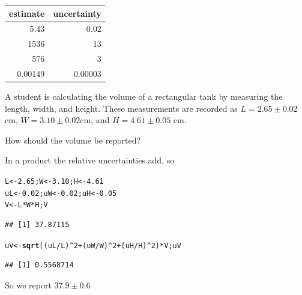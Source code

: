 \documentclass[twoside]{book}\usepackage[]{graphicx}\usepackage[]{xcolor}
\makeatletter
\newcommand{\hlnum}[1]{\textcolor[rgb]{0.686,0.059,0.569}{#1}}%
\newcommand{\hlopt}[1]{\textcolor[rgb]{0,0,0}{#1}}%
\newcommand{\hlstd}[1]{\textcolor[rgb]{0.345,0.345,0.345}{#1}}%
\newcommand{\hlkwb}[1]{\textcolor[rgb]{0.69,0.353,0.396}{#1}}%
\newcommand{\hlkwd}[1]{\textcolor[rgb]{0.737,0.353,0.396}{\textbf{#1}}}%
\newenvironment{kframe}{%
 \def\at@end@of@kframe{}%
 \ifinner\ifhmode%
  \def\at@end@of@kframe{\end{minipage}}%
  \begin{minipage}{\columnwidth}%
 \fi\fi%
 \def\FrameCommand##1{\hskip\@totalleftmargin \hskip-\fboxsep
 \colorbox{shadecolor}{##1}\hskip-\fboxsep
     \hskip-\linewidth \hskip-\@totalleftmargin \hskip\columnwidth}%
 \MakeFramed {\advance\hsize-\width
   \@totalleftmargin\z@ \linewidth\hsize
   \@setminipage}}%
 {\par\unskip\endMakeFramed%
 \at@end@of@kframe}
\newenvironment{knitrout}{}{} %
\makeatother
\begin{document}
\begin{solution}
	\begin{center}
	\begin{tabular}{rr}
		\hline
		estimate & uncertainty
		\\
		\hline
		5.43 & 0.02
		\\
		1536 & 13
		\\
		576 & 3
		\\
		0.00149 & 0.00003
		\\
		\hline
	\end{tabular}
	\end{center}
\end{solution}

\begin{problem}
	A student is calculating the volume of a rectangular tank by measuring 
	the length, width, and height.  These measurements are recorded as 
	 $L = 2.65 \pm 0.02$cm, $W = 3.10 \pm 0.02$cm, and $H = 4.61\pm 0.05$ cm.

	 How should the volume be reported?
\end{problem}

\begin{solution}
	In a product the relative uncertainties add, so
\begin{knitrout}
\color{fgcolor}\begin{kframe}
\begin{alltt}
\hlstd{L} \hlkwb{<-} \hlnum{2.65}\hlstd{; W} \hlkwb{<-} \hlnum{3.10}\hlstd{; H} \hlkwb{<-} \hlnum{4.61}
\hlstd{uL} \hlkwb{<-} \hlnum{0.02}\hlstd{; uW} \hlkwb{<-} \hlnum{0.02}\hlstd{; uH} \hlkwb{<-} \hlnum{0.05}
\hlstd{V} \hlkwb{<-} \hlstd{L} \hlopt{*} \hlstd{W} \hlopt{*} \hlstd{H; V}
\end{alltt}
\begin{verbatim}
## [1] 37.87115
\end{verbatim}
\begin{alltt}
\hlstd{uV} \hlkwb{<-} \hlkwd{sqrt}\hlstd{( (uL}\hlopt{/}\hlstd{L)}\hlopt{^}\hlnum{2} \hlopt{+} \hlstd{(uW}\hlopt{/}\hlstd{W)}\hlopt{^}\hlnum{2} \hlopt{+} \hlstd{(uH}\hlopt{/}\hlstd{H)}\hlopt{^}\hlnum{2}\hlstd{)} \hlopt{*} \hlstd{V; uV}
\end{alltt}
\begin{verbatim}
## [1] 0.5568714
\end{verbatim}
\end{kframe}
\end{knitrout}
	So we report $37.9 \pm 0.6$

\end{solution}
\end{document}

